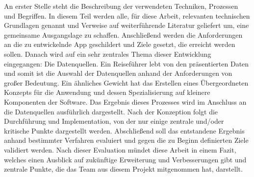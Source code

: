 	\vspace{0.25cm}
	
	An erster Stelle steht die Beschreibung der verwendeten Techniken, Prozessen und Begriffen. In diesem Teil werden alle, für diese Arbeit, relevanten technischen Grundlagen genannt und Verweise auf weiterführende Literatur geliefert um, eine gemeinsame Ausgangslage zu schaffen. Anschließend werden die Anforderungen an die zu entwickelnde App geschildert und Ziele gesetzt, die erreicht werden sollen. Danach wird auf ein sehr zentrales Thema dieser Entwicklung eingegangen: Die Datenquellen. Ein Reiseführer lebt von den präsentierten Daten und somit ist die Auswahl der Datenquellen anhand der Anforderungen von großer Bedeutung. Ein ähnliches Gewicht hat das Erstellen eines Übergeordneten Konzepts für die Anwendung und dessen Spezialisierung auf kleinere Komponenten der Software. Das Ergebnis dieses Prozesses wird im Anschluss an die Datenquellen ausführlich dargestellt. Nach der Konzeption folgt die Durchführung und Implementation, von der nur einige zentrale und/oder kritische Punkte dargestellt werden. Abschließend soll das entstandene Ergebnis anhand bestimmter Verfahren evaluiert und gegen die zu Beginn definierten Ziele validiert werden. Nach dieser Evaluation mündet diese Arbeit in einem Fazit, welches einen Ausblick auf zukünftige Erweiterung und Verbesserungen gibt und zentrale Punkte, die das Team aus diesem Projekt mitgenommen hat, darstellt.  
